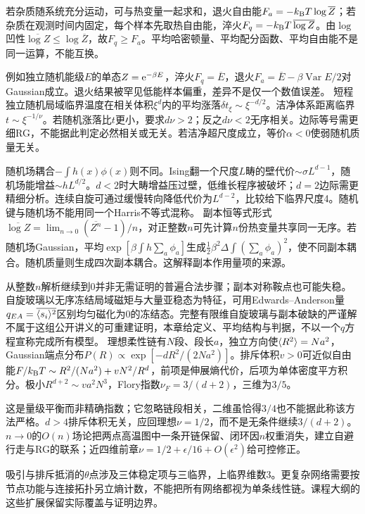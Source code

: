 \label{ch:random}
若杂质随系统充分运动，可与热变量一起求和，退火自由能$F_a=-k_{\mathrm B} T\log\overline Z$；若杂质在观测时间内固定，每个样本先取热自由能，淬火$F_q=-k_{\mathrm B} T\,\overline{\log Z}$。由$\log$凹性$\overline{\log Z}\le\log\overline Z$，故$F_q\ge F_a$。平均哈密顿量、平均配分函数、平均自由能不是同一运算，不能互换。

例如独立随机能级$E$的单态$Z=\mathrm e^{-\beta E}$，淬火$F_q=\overline E$，退火$F_a=\overline E-\beta\operatorname{Var}E/2$对Gaussian成立。退火结果被罕见低能样本偏重，差异不是仅一个数值误差。
短程独立随机局域临界温度在相关体积$\xi^d$内的平均涨落$\delta t_\xi\sim\xi^{-d/2}$。洁净体系距离临界$t\sim\xi^{-1/\nu}$。若随机涨落比$t$更小，要求$d\nu>2$；反之$d\nu<2$无序相关。边际等号需更细RG，不能据此判定必然相关或无关。若洁净超尺度成立，等价$\alpha<0$使弱随机质量无关。

随机场耦合$-\int h(x)\phi(x)$则不同。Ising翻一个尺度$L$畴的壁代价$\sim\sigma L^{d-1}$，随机场能增益$\sim hL^{d/2}$。$d<2$时大畴增益压过壁，低维长程序被破坏；$d=2$边际需更精细分析。连续自旋可通过缓慢转向降低代价为$L^{d-2}$，比较给下临界尺度4。随机键与随机场不能用同一个Harris不等式混称。
副本恒等式形式$\overline{\log Z}=\lim_{n\to0}(\overline{Z^n}-1)/n$，对正整数$n$可先计算$n$份热变量共享同一无序。若随机场Gaussian，平均$\exp[\beta\int h\sum_a\phi_a]$生成$\frac12\beta^2\Delta\int(\sum_a\phi_a)^2$，使不同副本耦合。随机质量则生成四次副本耦合。这解释副本作用量项的来源。

从整数$n$解析继续到0并非无需证明的普遍合法步骤；副本对称鞍点也可能失稳。自旋玻璃以无序冻结局域磁矩与大量亚稳态为特征，可用Edwards--Anderson量$q_{EA}=\overline{\langle s_i\rangle^2}$区别均匀磁化为0的冻结态。完整有限维自旋玻璃与副本破缺的严谨解不属于这组公开讲义的可重建证明，本章给定义、平均结构与判据，不以一个$q$方程宣称完成所有模型。
理想柔性链有$N$段、段长$a$，独立方向使$\langle R^2\rangle=Na^2$，Gaussian端点分布$P(R)\propto\exp[-dR^2/(2Na^2)]$。排斥体积$ v>0$可近似自由能$F/k_{\mathrm B} T\sim R^2/(Na^2)+vN^2/R^d$，前项是伸展熵代价，后项为单体密度平方积分。极小$R^{d+2}\sim v a^2N^3$，Flory指数$\nu_F=3/(d+2)$，三维为$3/5$。

这是量级平衡而非精确指数；它忽略链段相关，二维虽恰得$3/4$也不能据此称该方法严格。$d>4$排斥体积无关，应回理想$\nu=1/2$，而不是无条件继续$3/(d+2)$。$n\to0$的$O(n)$场论把两点高温图中一条开链保留、闭环因$n$权重消失，建立自避行走与RG的联系；近四维前章$\nu=1/2+\epsilon/16+O(\epsilon^2)$给可控修正。

吸引与排斥抵消的$\theta$点涉及三体稳定项与三临界，上临界维数3。更复杂网络需要按节点功能与连接拓扑另立熵计数，不能把所有网络都视为单条线性链。课程大纲的这些扩展保留实际覆盖与证明边界。
